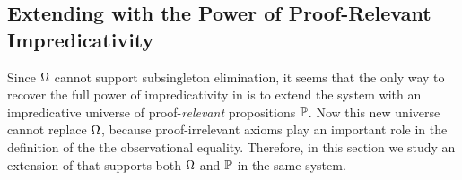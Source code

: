 

\subsection{Extending \SetoidCC with the Power of Proof-Relevant Impredicativity}

Since \( \Omega \) cannot support subsingleton elimination, it seems that the 
only way to recover the full power of impredicativity in \SetoidCC is to extend 
% 
the system with an impredicative universe of proof-\emph{relevant} propositions 
\( \mathbb{P} \). 
% 
% 
Now this new universe cannot replace \( \Omega \), because 
proof-irrelevant axioms play an important role in the definition of the
the observational equality. 
% 
Therefore, in this section we study an extension of \SetoidCC that supports both \( \Omega \) 
and \( \mathbb{P} \) in the same system.
% 

